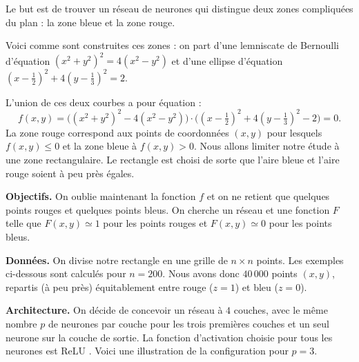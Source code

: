 \documentclass[11pt,class=report,crop=false]{standalone}
\begin{document}
Le but est de trouver un réseau de neurones qui distingue deux zones compliquées du plan : la zone bleue et la zone rouge.




Voici comme sont construites ces zones : on part d'une lemniscate de Bernoulli d'équation $(x^2+y^2)^2 = 4(x^2-y^2)$ et d'une ellipse d'équation
$(x-\frac12)^2 + 4(y-\frac13)^2=2$. 

\begin{center}
\begin{minipage}{0.31\textwidth}
\end{minipage}
\quad
\begin{minipage}{0.31\textwidth}

\end{minipage}
\quad
\begin{minipage}{0.31\textwidth}
\end{minipage}
\end{center}


L'union de ces deux courbes a pour équation :
$$f(x,y) = \big( (x^2+y^2)^2 - 4(x^2-y^2) \big)  \cdot \big((x-\tfrac12)^2 + 4(y-\tfrac13)^2 - 2 \big) = 0.$$
La zone rouge correspond aux points de coordonnées $(x,y)$ pour lesquels $f(x,y) \le 0$ et la zone bleue à $f(x,y) > 0$. Nous allons limiter notre étude à une zone rectangulaire. Le rectangle est choisi de sorte que l'aire bleue et l'aire rouge soient à peu près égales.

\textbf{Objectifs.} 
On oublie maintenant la fonction $f$ et on ne retient que quelques points rouges et quelques points bleus. On cherche un réseau et une fonction $F$ telle que $F(x,y) \simeq 1$ pour les points rouges et $F(x,y) \simeq 0$ pour les points bleus.

\textbf{Données.} 
On divise notre rectangle en une grille de $n \times n$ points. Les exemples ci-dessous sont calculés pour $n=200$. Nous avons donc $40\,000$ points $(x,y)$, repartis (à peu près) équitablement entre rouge ($z=1$) et bleu ($z=0$).

\textbf{Architecture.}
On décide de concevoir un réseau à $4$ couches, avec le même nombre $p$ de neurones par couche pour les trois premières couches et un seul neurone sur la couche de sortie. La fonction d'activation choisie pour tous les neurones est ReLU .
Voici une illustration de la configuration pour $p=3$.
\end{document}
